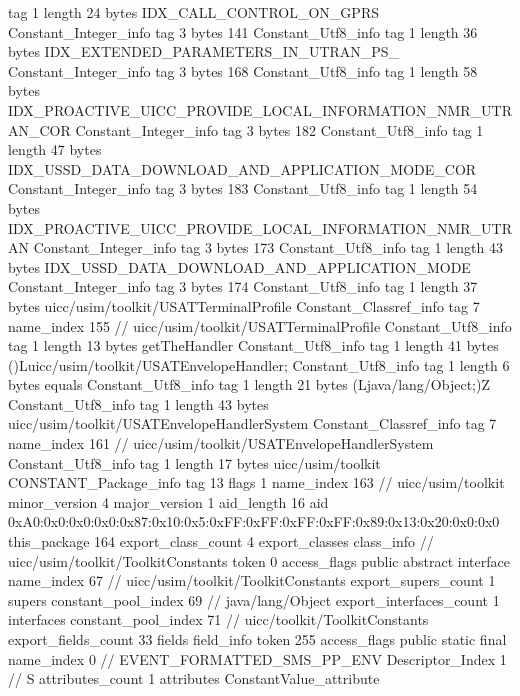 {{{			tag	1
			length	24
			bytes	IDX_CALL_CONTROL_ON_GPRS
		}
		Constant_Integer_info {
			tag	3
			bytes	141
		}
		Constant_Utf8_info {
			tag	1
			length	36
			bytes	IDX_EXTENDED_PARAMETERS_IN_UTRAN_PS_
		}
		Constant_Integer_info {
			tag	3
			bytes	168
		}
		Constant_Utf8_info {
			tag	1
			length	58
			bytes	IDX_PROACTIVE_UICC_PROVIDE_LOCAL_INFORMATION_NMR_UTRAN_COR
		}
		Constant_Integer_info {
			tag	3
			bytes	182
		}
		Constant_Utf8_info {
			tag	1
			length	47
			bytes	IDX_USSD_DATA_DOWNLOAD_AND_APPLICATION_MODE_COR
		}
		Constant_Integer_info {
			tag	3
			bytes	183
		}
		Constant_Utf8_info {
			tag	1
			length	54
			bytes	IDX_PROACTIVE_UICC_PROVIDE_LOCAL_INFORMATION_NMR_UTRAN
		}
		Constant_Integer_info {
			tag	3
			bytes	173
		}
		Constant_Utf8_info {
			tag	1
			length	43
			bytes	IDX_USSD_DATA_DOWNLOAD_AND_APPLICATION_MODE
		}
		Constant_Integer_info {
			tag	3
			bytes	174
		}
		Constant_Utf8_info {
			tag	1
			length	37
			bytes	uicc/usim/toolkit/USATTerminalProfile
		}
		Constant_Classref_info {
			tag	7
			name_index	155		// uicc/usim/toolkit/USATTerminalProfile
		}
		Constant_Utf8_info {
			tag	1
			length	13
			bytes	getTheHandler
		}
		Constant_Utf8_info {
			tag	1
			length	41
			bytes	()Luicc/usim/toolkit/USATEnvelopeHandler;
		}
		Constant_Utf8_info {
			tag	1
			length	6
			bytes	equals
		}
		Constant_Utf8_info {
			tag	1
			length	21
			bytes	(Ljava/lang/Object;)Z
		}
		Constant_Utf8_info {
			tag	1
			length	43
			bytes	uicc/usim/toolkit/USATEnvelopeHandlerSystem
		}
		Constant_Classref_info {
			tag	7
			name_index	161		// uicc/usim/toolkit/USATEnvelopeHandlerSystem
		}
		Constant_Utf8_info {
			tag	1
			length	17
			bytes	uicc/usim/toolkit
		}
		CONSTANT_Package_info {
			tag	13
			flags	1
			name_index	163		// uicc/usim/toolkit
			minor_version	4
			major_version	1
			aid_length	16
			aid	0xA0:0x0:0x0:0x0:0x87:0x10:0x5:0xFF:0xFF:0xFF:0xFF:0x89:0x13:0x20:0x0:0x0
		}
	}
	this_package	164
	export_class_count	4
	export_classes {
		class_info {		// uicc/usim/toolkit/ToolkitConstants
			token	0
			access_flags	public abstract interface
			name_index	67		// uicc/usim/toolkit/ToolkitConstants
			export_supers_count	1
			supers {
				constant_pool_index	69		// java/lang/Object
			}
			export_interfaces_count	1
			interfaces {
				constant_pool_index	71		// uicc/toolkit/ToolkitConstants
			}
			export_fields_count	33
			fields {
			field_info {
				token	255
				access_flags	public static final
				name_index	0		// EVENT_FORMATTED_SMS_PP_ENV
				Descriptor_Index	1		// S
				attributes_count	1
				attributes {
				ConstantValue_attribute {
}}}}}}}
